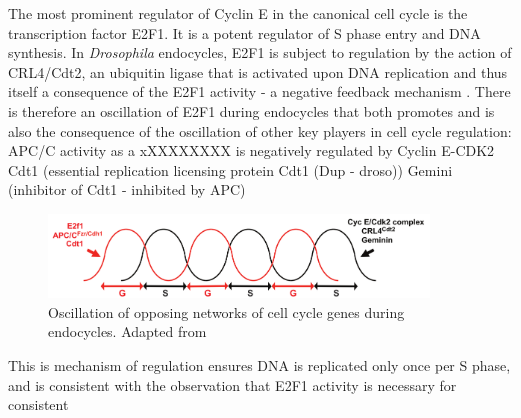 \documentclass[11pt,twoside,a4paper]{report}
\begin{document}
				The most prominent regulator of Cyclin E in the canonical cell cycle is the transcription factor E2F1. It is a potent regulator of S phase entry and DNA synthesis.
				In \textit{Drosophila} endocycles, E2F1 is subject to regulation by the action of CRL4/Cdt2, an ubiquitin ligase that is activated upon DNA replication and thus itself a consequence of the E2F1 activity - a negative feedback mechanism \cite{Zielke2011}\cite{Havens2011}\cite{Shibutani2008}.  There is therefore an oscillation of E2F1 during endocycles that both promotes and is also the consequence of the oscillation of other key players in cell cycle regulation: 
				APC/C activity as a xXXXXXXXX is negatively regulated by Cyclin E-CDK2
				Cdt1 (essential replication licensing protein Cdt1 (Dup - droso))
				Gemini (inhibitor of Cdt1 - inhibited by APC)
				
				\begin{figure}[here]
					\centering
					\includegraphics[width=0.9\textwidth]{pngs/oscilation.png}
					\caption{Oscillation of opposing networks of cell cycle genes during endocycles. {\footnotesize Adapted from \cite{Fox2013}}}
					\label{fig:oscillation}
				\end{figure}
				
				
				This is mechanism of regulation ensures DNA is replicated only once per S phase, and is consistent with the observation that E2F1 activity is necessary for 
				consistent 
			
\end{document}
